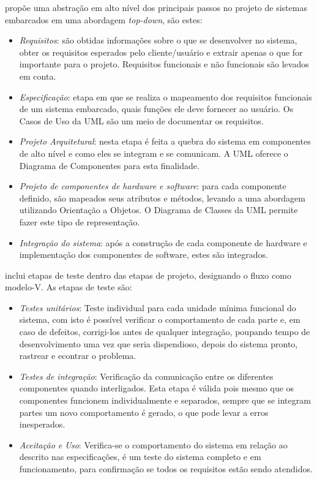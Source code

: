\textcite{Wolf:2001} propõe uma abstração em alto nível dos principais passos no projeto de sistemas embarcados em uma abordagem \textit{top-down}, são estes:

\begin{itemize}
	\item \emph{Requisitos}: são obtidas informações sobre o que se desenvolver no sistema, obter os requisitos esperados pelo cliente/usuário e extrair apenas o que for importante para o projeto. Requisitos funcionais e não funcionais são levados em conta.
	\item \emph{Especificação}: etapa em que se realiza o mapeamento dos requisitos funcionais de um sistema embarcado, quais funções ele deve fornecer ao usuário. Os Casos de Uso da UML são um meio de documentar os requisitos.
	\item \emph{Projeto Arquitetural}: nesta etapa é feita a quebra do sistema em componentes de alto nível e como eles se integram e se comunicam. A UML oferece o Diagrama de Componentes para esta finalidade.
	\item \emph{Projeto de componentes de hardware e software}: para cada componente definido, são mapeados seus atributos e métodos, levando a uma abordagem utilizando Orientação a Objetos. O Diagrama de Classes da UML permite fazer este tipo de representação.
	 \item \emph{Integração do sistema}: após a construção de cada componente de hardware e implementação dos componentes de software, estes são integrados.
\end{itemize}
\textcite{Marwedel:2001}  inclui etapas de teste dentro das etapas de projeto, designando o fluxo como modelo-V. As etapas de teste são: 

\begin{itemize}
	\item \emph{Testes unitários}: Teste individual para cada unidade mínima funcional do sistema, com isto é possível verificar o comportamento de cada parte e, em caso de defeitos, corrigi-los antes de qualquer integração, poupando tempo de desenvolvimento uma vez que seria dispendioso, depois do sistema pronto, rastrear e econtrar o problema.
	\item \emph{Testes de integração}: Verificação da comunicação entre os diferentes componentes quando interligados. Esta etapa é válida pois mesmo que os componentes funcionem individualmente e separados, sempre que se integram partes um novo comportamento é gerado, o que pode levar a erros inesperados.
	\item \emph{Aceitação e Uso}: Verifica-se o comportamento do sistema em relação ao descrito nas especificações, é um teste do sistema completo e em funcionamento, para confirmação se todos os requisitos estão sendo atendidos.
\end{itemize}


